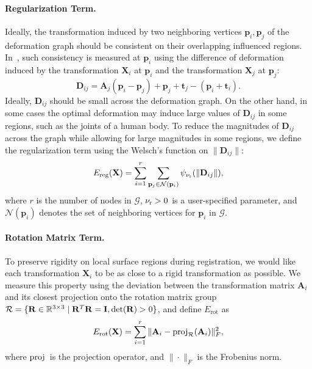 \paragraph{Regularization Term.}
Ideally, the transformation induced by two neighboring vertices $\mathbf{p}_i, \mathbf{p}_j$ of the deformation graph should be consistent on their overlapping influenced regions. In~\cite{sumner2007embedded}, such consistency is measured at $\mathbf{p}_i$ using the difference of deformation induced by the transformation $\mathbf{X}_i$ at $\mathbf{p}_i$ and the transformation $\mathbf{X}_j$ at  $\mathbf{p}_j$:
\begin{equation}
    \mathbf{D}_{ij} = \mathbf{A}_j (\mathbf{p}_i - \mathbf{p}_j) + \mathbf{p}_j + \mathbf{t}_j - (\mathbf{p}_i + \mathbf{t}_i).
    \label{eq:Dij}
\end{equation}
Ideally, $\mathbf{D}_{ij}$ should be small across the deformation graph. On the other hand, in some cases the optimal deformation may induce large values of $\mathbf{D}_{ij}$ in some regions, such as the joints of a human body. To reduce the magnitudes of $\mathbf{D}_{ij}$ across the graph while allowing for large magnitudes in some regions, we define the regularization term using the Welsch's function on $\|\mathbf{D}_{ij}\|$:
\begin{equation}
    E_{\text{reg}}(\mathbf{X}) = \sum_{i=1}^r
    \sum_{\mathbf{p}_{j} \in \mathcal{N}(\mathbf{p}_{i})} \psi_{\nu_{\textrm{r}}}(\|\mathbf{D}_{ij}\|),
    \label{eq:Ereg}
\end{equation}
where $r$ is the number of nodes in $\mathcal{G}$, $\nu_{\textrm{r}} > 0$ is a user-specified parameter, and $\mathcal{N}(\mathbf{p}_{i})$ denotes the set of neighboring vertices for $\mathbf{p}_{i}$ in $\mathcal{G}$.

\paragraph{Rotation Matrix Term.} To preserve rigidity on local surface regions during registration, we would like each transformation $\mathbf{X}_i$ to be as close to a rigid transformation as possible. We measure this property using the deviation between the transformation matrix $\mathbf{A}_i$ and its closest projection onto the rotation matrix group $\mathcal{R} = \{\mathbf{R} \in \mathbb{R}^{3 \times 3} \mid \mathbf{R}^T \mathbf{R} = \mathbf{I}, \det(\mathbf{R}) > 0\}$, and define $E_{\text{rot}}$ as
\begin{equation}
E_{\text{rot}}(\mathbf{X}) = \sum_{i=1}^r\|\mathbf{A}_i - \operatorname*{proj}\nolimits_{\mathcal{R}}(\mathbf{A}_i)\|_F^2,
\label{eq:rigid}
\end{equation}
where $\operatorname*{proj}{}$ is the projection operator, and $\|\cdot\|_F$ is the Frobenius norm. 

